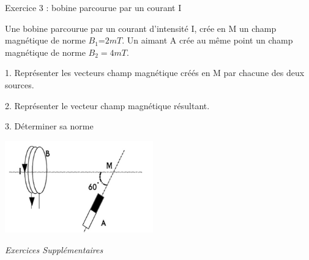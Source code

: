 \documentclass[12pt, french]{article}
\begin{document}
\begin{Box2}{Exercice 3 :  bobine parcourue par un courant I}


   Une bobine parcourue par un courant d’intensité I, crée en M un champ magnétique de norme $B_1$=$2mT$.
Un aimant A crée au même point un champ magnétique de norme $B_2=4mT$.

1. Représenter les vecteurs champ magnétique créés en M par chacune des deux sources.

2. Représenter le vecteur champ magnétique résultant.

3. Déterminer sa norme
  \begin{center}
     \includegraphics[width=0.48\textwidth]{./img/exo03.png}
  \end{center}

\end{Box2}
\begin{center}

   \vspace{4cm}
   \Large{ \em{Exercices Supplémentaires}}
\end{center}
\end{document}
